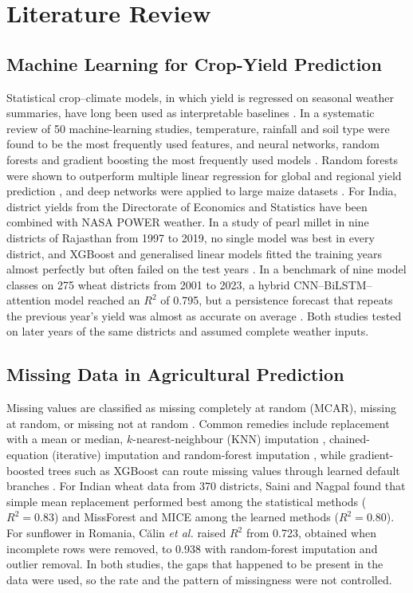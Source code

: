 \section{Literature Review}\label{sec:lit}

\subsection{Machine Learning for Crop-Yield Prediction}

Statistical crop--climate models, in which yield is regressed on seasonal weather summaries,
have long been used as interpretable baselines \cite{lobell2010}. In a systematic review of 50
machine-learning studies, temperature, rainfall and soil type were found to be the most frequently
used features, and neural networks, random forests and gradient boosting the most frequently used
models \cite{vanklompenburg2020}. Random forests were shown to outperform multiple linear regression
for global and regional yield prediction \cite{jeong2016}, and deep networks were applied to large
maize datasets \cite{khaki2019}. For India, district yields from the Directorate of Economics and
Statistics have been combined with NASA POWER weather. In a study of pearl millet in nine districts
of Rajasthan from 1997 to 2019, no single model was best in every district, and XGBoost and
generalised linear models fitted the training years almost perfectly but often failed on the test
years \cite{alsaber2025}. In a benchmark of nine model classes on 275 wheat districts from 2001
to 2023, a hybrid CNN--BiLSTM--attention model reached an $R^2$ of 0.795, but a persistence
forecast that repeats the previous year's yield was almost as accurate on average
\cite{manogna2026}. Both studies tested on later years of the same districts and assumed complete
weather inputs.

\subsection{Missing Data in Agricultural Prediction}

Missing values are classified as missing completely at random (MCAR), missing at random, or
missing not at random \cite{little2019}. Common remedies include replacement with a mean or median,
$k$-nearest-neighbour (KNN) imputation \cite{troyanskaya2001}, chained-equation (iterative)
imputation \cite{vanbuuren2011} and random-forest imputation \cite{stekhoven2012}, while
gradient-boosted trees such as XGBoost can route missing values through learned default branches
\cite{chen2016}. For Indian wheat data from 370 districts, Saini and Nagpal \cite{saini2024} found
that simple mean replacement performed best among the statistical methods ($R^2 = 0.83$) and
MissForest and MICE among the learned methods ($R^2 = 0.80$). For sunflower in Romania, Călin
\emph{et al.} \cite{calin2023} raised $R^2$ from 0.723, obtained when incomplete rows were removed,
to 0.938 with random-forest imputation and outlier removal. In both studies, the gaps that
happened to be present in the data were used, so the rate and the pattern of missingness were not
controlled.

